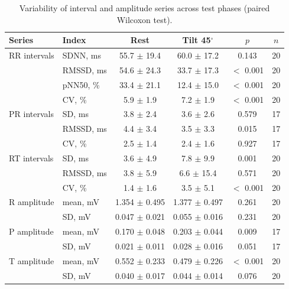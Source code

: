 \begin{table}[htbp]
\caption{Variability of interval and amplitude series across test phases (paired Wilcoxon test).}
\label{tab:Avar}
\begin{center}\small
\begin{tabular}{|l|l|c|c|c|c|}
\hline
Series & Index & Rest & Tilt 45$^{\circ}$ & $p$ & $n$ \\
\hline
RR intervals & SDNN, ms & 55.7 $\pm$ 19.4 & 60.0 $\pm$ 17.2 & 0.143 & 20 \\
 & RMSSD, ms & 54.6 $\pm$ 24.3 & 33.7 $\pm$ 17.3 & $<$ 0.001 & 20 \\
 & pNN50, \% & 33.4 $\pm$ 21.1 & 12.4 $\pm$ 15.0 & $<$ 0.001 & 20 \\
 & CV, \% & 5.9 $\pm$ 1.9 & 7.2 $\pm$ 1.9 & $<$ 0.001 & 20 \\
\hline
PR intervals & SD, ms & 3.8 $\pm$ 2.4 & 3.6 $\pm$ 2.6 & 0.579 & 17 \\
 & RMSSD, ms & 4.4 $\pm$ 3.4 & 3.5 $\pm$ 3.3 & 0.015 & 17 \\
 & CV, \% & 2.5 $\pm$ 1.4 & 2.4 $\pm$ 1.6 & 0.927 & 17 \\
\hline
RT intervals & SD, ms & 3.6 $\pm$ 4.9 & 7.8 $\pm$ 9.9 & 0.001 & 20 \\
 & RMSSD, ms & 3.8 $\pm$ 5.9 & 6.6 $\pm$ 15.4 & 0.571 & 20 \\
 & CV, \% & 1.4 $\pm$ 1.6 & 3.5 $\pm$ 5.1 & $<$ 0.001 & 20 \\
\hline
R amplitude & mean, mV & 1.354 $\pm$ 0.495 & 1.377 $\pm$ 0.497 & 0.261 & 20 \\
 & SD, mV & 0.047 $\pm$ 0.021 & 0.055 $\pm$ 0.016 & 0.231 & 20 \\
\hline
P amplitude & mean, mV & 0.170 $\pm$ 0.048 & 0.203 $\pm$ 0.044 & 0.009 & 17 \\
 & SD, mV & 0.021 $\pm$ 0.011 & 0.028 $\pm$ 0.016 & 0.051 & 17 \\
\hline
T amplitude & mean, mV & 0.552 $\pm$ 0.233 & 0.479 $\pm$ 0.226 & $<$ 0.001 & 20 \\
 & SD, mV & 0.040 $\pm$ 0.017 & 0.044 $\pm$ 0.014 & 0.076 & 20 \\
\hline
\end{tabular}
\end{center}
\end{table}
